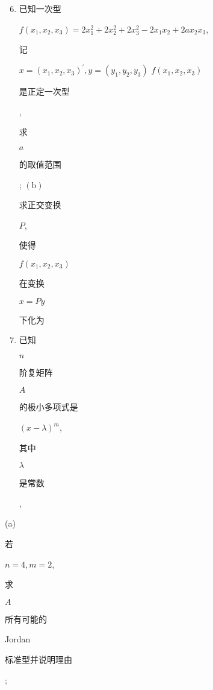 \documentclass[10pt]{article}
\begin{document}
\begin{enumerate}
  \setcounter{enumi}{5}
  \item \begin{CJK}{UTF8}{mj}已知一次型\end{CJK} $f\left(x_{1}, x_{2}, x_{3}\right)=2 x_{1}^{2}+2 x_{2}^{2}+2 x_{3}^{2}-2 x_{1} x_{2}+2 a x_{2} x_{3}$, \begin{CJK}{UTF8}{mj}记\end{CJK} $x=\left(x_{1}, x_{2}, x_{3}\right)^{\prime}, y=\left(y_{1}, y_{2}, y_{3}\right)$ $f\left(x_{1}, x_{2}, x_{3}\right)$ \begin{CJK}{UTF8}{mj}是正定一次型\end{CJK}, \begin{CJK}{UTF8}{mj}求\end{CJK} $a$ \begin{CJK}{UTF8}{mj}的取值范围\end{CJK}; $(\mathrm{b})$ \begin{CJK}{UTF8}{mj}求正交变换\end{CJK} $P$, \begin{CJK}{UTF8}{mj}使得\end{CJK} $f\left(x_{1}, x_{2}, x_{3}\right)$ \begin{CJK}{UTF8}{mj}在变换\end{CJK} $x=P y$ \begin{CJK}{UTF8}{mj}下化为\end{CJK}

  \item \begin{CJK}{UTF8}{mj}已知\end{CJK} $n$ \begin{CJK}{UTF8}{mj}阶复矩阵\end{CJK} $A$ \begin{CJK}{UTF8}{mj}的极小多项式是\end{CJK} $(x-\lambda)^{m}$, \begin{CJK}{UTF8}{mj}其中\end{CJK} $\lambda$ \begin{CJK}{UTF8}{mj}是常数\end{CJK},

\end{enumerate}
(a) \begin{CJK}{UTF8}{mj}若\end{CJK} $n=4, m=2$, \begin{CJK}{UTF8}{mj}求\end{CJK} $A$ \begin{CJK}{UTF8}{mj}所有可能的\end{CJK} Jordan \begin{CJK}{UTF8}{mj}标准型并说明理由\end{CJK};
\end{document}
